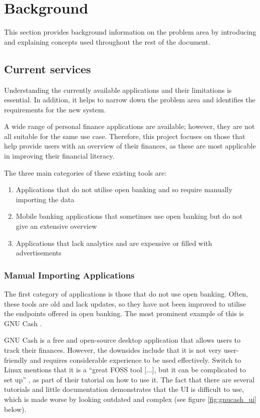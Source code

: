 \chapter{Background}
\label{ch:background}

This section provides background information on the problem area by introducing and explaining concepts used throughout the rest of the document.

\section{Current services}
\label{sec:current-services}
Understanding the currently available applications and their limitations is essential. In addition, it helps to narrow down the problem area and identifies the requirements for the new system.

A wide range of personal finance applications are available; however, they are not all suitable for the same use case. Therefore, this project focuses on those that help provide users with an overview of their finances, as these are most applicable in improving their financial literacy.

The three main categories of these existing tools are:
\begin{enumerate}
    \item Applications that do not utilise open banking and so require manually importing the data
    \item Mobile banking applications that sometimes use open banking but do not give an extensive overview
    \item Applications that lack analytics and are expensive or filled with advertisements
\end{enumerate}

\subsection{Manual Importing Applications}
\label{sec:manual-importing-applications}
The first category of applications is those that do not use open banking. Often, these tools are old and lack updates, so they have not been improved to utilise the endpoints offered in open banking. The most prominent example of this is GNU Cash \cite{GNUCash}.

GNU Cash is a free and open-source desktop application that allows users to track their finances. However, the downsides include that it is not very user-friendly and requires considerable experience to be used effectively. Switch to Linux mentions that it is a ``great FOSS tool [...], but it can be complicated to set up'' \cite{GNUCashSwitchedToLinux}, as part of their tutorial on how to use it. The fact that there are several tutorials and little documentation demonstrates that the UI is difficult to use, which is made worse by looking outdated and complex (see figure \ref{fig:gnucash_ui} below).

